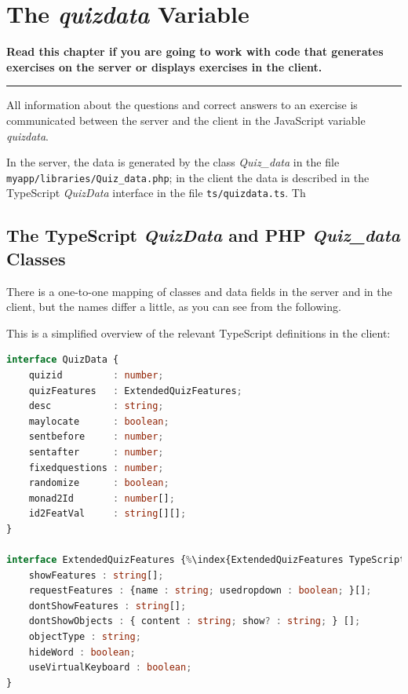 \documentclass[11pt,oneside,a4paper]{memoir}
\begin{document}
\chapter{The \emph{quizdata} Variable}\label{chap-quizdata}%

\textbf{Read this chapter if you are going to work with code that generates exercises on
  the server or displays exercises in the client.} 
\plainbreak{3}

All information about the questions and correct answers to an exercise is communicated between the
server and the client in the JavaScript variable \emph{quizdata}.

In the server, the data is generated by the class \emph{Quiz\_data} in the file
\texttt{myapp/\allowbreak{}libraries/\allowbreak{}Quiz\_data.php}; in the client the data is described in the TypeScript
\emph{QuizData} interface in the file \texttt{ts/quizdata.ts}. Th



\section{The TypeScript \emph{QuizData} and PHP \emph{Quiz\_data} Classes}%
%

There is a one-to-one mapping of classes and data fields in the server and in the client, but the
names differ a little, as you can see from the following.

This is a simplified overview of the relevant TypeScript definitions in the client:

\begin{lstlisting}[language=TypeScript]
interface QuizData {
    quizid         : number;
    quizFeatures   : ExtendedQuizFeatures;
    desc           : string;
    maylocate      : boolean;
    sentbefore     : number;
    sentafter      : number;
    fixedquestions : number;
    randomize      : boolean;
    monad2Id       : number[];
    id2FeatVal     : string[][];
}

interface ExtendedQuizFeatures {%\index{ExtendedQuizFeatures TypeScript interface@\emph{ExtendedQuizFeatures} TypeScript interface}%
    showFeatures : string[];
    requestFeatures : {name : string; usedropdown : boolean; }[];
    dontShowFeatures : string[];
    dontShowObjects : { content : string; show? : string; } [];
    objectType : string;
    hideWord : boolean;
    useVirtualKeyboard : boolean;
}
\end{lstlisting}
\end{document}
